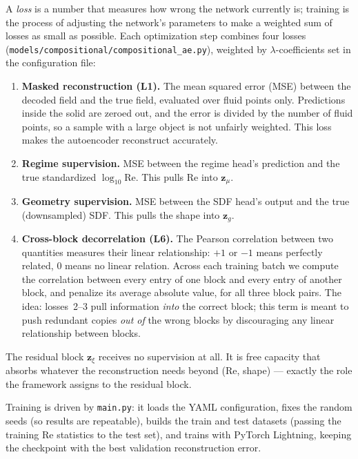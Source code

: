 \documentclass[11pt]{article}
\begin{document}
A \emph{loss} is a number that measures how wrong the network currently
is; training is the process of adjusting the network's parameters to make
a weighted sum of losses as small as possible. Each optimization step
combines four losses (\texttt{models/compositional/compositional\_ae.py}),
weighted by $\lambda$-coefficients set in the configuration file:
%
\begin{enumerate}
  \item \textbf{Masked reconstruction (L1).} The mean squared error (MSE)
        between the decoded field and the true field, evaluated over
        fluid points only. Predictions inside the solid are zeroed out,
        and the error is divided by the number of fluid points, so a
        sample with a large object is not unfairly weighted. This loss
        makes the autoencoder reconstruct accurately.
  \item \textbf{Regime supervision.} MSE between the regime head's
        prediction and the true standardized $\log_{10}\mathrm{Re}$.
        This pulls Re into $\boldsymbol{z}_{\mu}$.
  \item \textbf{Geometry supervision.} MSE between the SDF head's output
        and the true (downsampled) SDF. This pulls the shape into
        $\boldsymbol{z}_{g}$.
  \item \textbf{Cross-block decorrelation (L6).} The Pearson correlation
        between two quantities measures their linear relationship: $+1$
        or $-1$ means perfectly related, $0$ means no linear relation.
        Across each training batch we compute the correlation between
        every entry of one block and every entry of another block, and
        penalize its average absolute value, for all three block pairs.
        The idea: losses~2--3 pull information \emph{into} the correct
        block; this term is meant to push redundant copies \emph{out of}
        the wrong blocks by discouraging any linear relationship between
        blocks.
\end{enumerate}
%
The residual block $\boldsymbol{z}_{\xi}$ receives no supervision at all.
It is free capacity that absorbs whatever the reconstruction needs beyond
(Re, shape) --- exactly the role the framework assigns to the residual
block.

Training is driven by \texttt{main.py}: it loads the YAML configuration,
fixes the random seeds (so results are repeatable), builds the train and
test datasets (passing the training Re statistics to the test set), and
trains with PyTorch Lightning, keeping the checkpoint with the best
validation reconstruction error.
\end{document}
